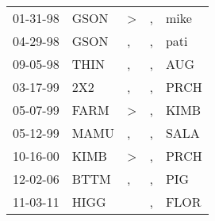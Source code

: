 \begin{supertabular}{p{0.07\textwidth}p{0.06\textwidth}p{0.02\textwidth}p{0.02\textwidth}p{0.06\textwidth}}
 01-31-98\textsuperscript{} &  GSON\textsuperscript{} &  \textgreater &  , &  mike\textsuperscript{} \\
 04-29-98\textsuperscript{} &  GSON\textsuperscript{} &             , &  , &  pati\textsuperscript{} \\
 09-05-98\textsuperscript{} &  THIN\textsuperscript{} &             , &  , &   AUG\textsuperscript{} \\
 03-17-99\textsuperscript{} &   2X2\textsuperscript{} &             , &  , &  PRCH\textsuperscript{} \\
 05-07-99\textsuperscript{} &  FARM\textsuperscript{} &  \textgreater &  , &  KIMB\textsuperscript{} \\
 05-12-99\textsuperscript{} &  MAMU\textsuperscript{} &             , &  , &  SALA\textsuperscript{} \\
 10-16-00\textsuperscript{} &  KIMB\textsuperscript{} &  \textgreater &  , &  PRCH\textsuperscript{} \\
 12-02-06\textsuperscript{} &  BTTM\textsuperscript{} &             , &  , &   PIG\textsuperscript{} \\
 11-03-11\textsuperscript{} &  HIGG\textsuperscript{} &               &  , &  FLOR\textsuperscript{} \\
\end{supertabular}
